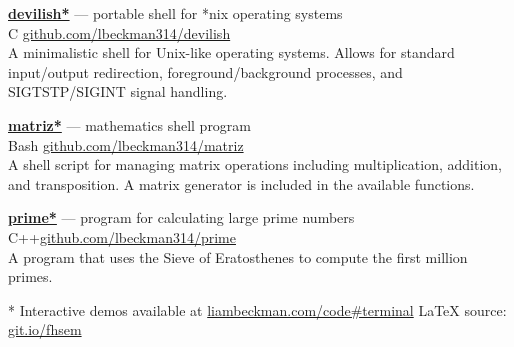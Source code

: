 \documentclass[a4paper]{article}
\begin{document}
\textcolor{my-grey}{\dotfill}
\medbreak

\textcolor{my-blue}{\textbf{\href{https://liambeckman.com/code/devilish}{devilish*}}} --- portable shell for *nix operating systems\\
\textcolor{my-grey}{C \hfill \href{https://github.com/lbeckman314/devilish}{github.com/lbeckman314/devilish}}\\

A minimalistic shell for Unix-like operating systems. Allows for standard input/output redirection, foreground/background processes, and SIGTSTP/SIGINT signal handling. 

\textcolor{my-grey}{\dotfill}
\medbreak

\textcolor{my-blue}{\textbf{\href{https://liambeckman.com/code/matriz}{matriz*}}} --- mathematics shell program\\
\textcolor{my-grey}{Bash \hfill \href{https://github.com/lbeckman314/matriz}{github.com/lbeckman314/matriz}}\\

A shell script for managing matrix operations including multiplication, addition, and transposition. A matrix generator is included in the available functions.

\textcolor{my-grey}{\dotfill}
\medbreak

\textcolor{my-blue}{\textbf{\href{https://liambeckman.com/code/matriz}{prime*}}} --- program for calculating large prime numbers\\
\textcolor{my-grey}{C++\hfill \href{https://github.com/lbeckman314/prime}{github.com/lbeckman314/prime}}\\

A program that uses the Sieve of Eratosthenes to compute the first million primes.

\textcolor{my-grey}{\dotfill}
\medbreak

\vfill
* Interactive demos available at \textcolor{my-blue}{\href{https://liambeckman.com/code#terminal}{liambeckman.com/code\#terminal}}
\hfill\textcolor{my-red}{\LaTeX{} source: \href{https://git.io/fhsem}{git.io/fhsem}}
\end{document}
